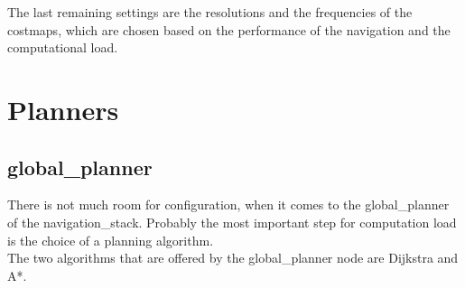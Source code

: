 The last remaining settings are the resolutions and the frequencies of the costmaps, which are chosen based on the performance of the navigation and the computational load.


\section{Planners}

\subsection{global\_planner}
\label{globalplannertest}
There is not much room for configuration, when it comes to the global\_planner of the navigation\_stack. Probably the most important step for computation load is the choice of a planning algorithm.\\
The two algorithms that are offered by the global\_planner node are Dijkstra and A*.\\


